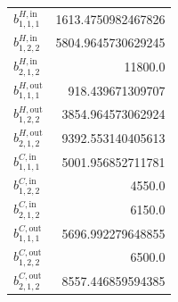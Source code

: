 \documentclass{article}%
\begin{document}
\begin{multicols*}{3}
\begin{supertabular}{lr}
	$b_{1,1,1}^{H,\text{in}}$ & 1613.4750982467826 \\%
	$b_{1,2,2}^{H,\text{in}}$ & 5804.9645730629245 \\%
	$b_{2,1,2}^{H,\text{in}}$ & 11800.0 \\%
	$b_{1,1,1}^{H,\text{out}}$ & 918.439671309707 \\%
	$b_{1,2,2}^{H,\text{out}}$ & 3854.964573062924 \\%
	$b_{2,1,2}^{H,\text{out}}$ & 9392.553140405613 \\%
	$b_{1,1,1}^{C,\text{in}}$ & 5001.956852711781 \\%
	$b_{1,2,2}^{C,\text{in}}$ & 4550.0 \\%
	$b_{2,1,2}^{C,\text{in}}$ & 6150.0 \\%
	$b_{1,1,1}^{C,\text{out}}$ & 5696.992279648855 \\%
	$b_{1,2,2}^{C,\text{out}}$ & 6500.0 \\%
	$b_{2,1,2}^{C,\text{out}}$ & 8557.446859594385 \\%
\end{supertabular}%
\end{multicols*}%
\clearpage%
\end{document}
